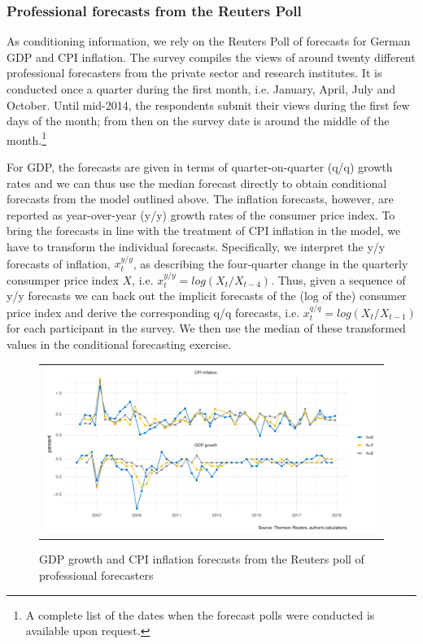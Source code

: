 \documentclass[notitlepage,a4paper,12pt]{article}
\begin{document}
\subsubsection{Professional forecasts from the Reuters Poll}

As conditioning information, we rely on the Reuters Poll of forecasts for German GDP and CPI inflation. The survey compiles the views of around twenty different professional forecasters from the private sector and research institutes. It is conducted once a quarter during the first month, i.e. January, April, July and October. Until mid-2014, the respondents submit their views during the first few days of the month; from then on the survey date is around the middle of the month.\footnote{A complete list of the dates when the forecast polls were conducted is available upon request.}  

For GDP, the forecasts are given in terms of quarter-on-quarter (q/q) growth rates and we can thus use the median forecast directly to obtain conditional forecasts from the model outlined above. The inflation forecasts, however, are reported as year-over-year (y/y) growth rates of the consumer price index. To bring the forecasts in line with the treatment of CPI inflation in the model, we have to transform the individual forecasts. Specifically, we interpret the y/y forecasts of inflation, $x_t^{y/y}$, as describing the four-quarter change in the quarterly consumper price index $X$, i.e. $ x_t^{y/y} = log(X_t/X_{t-4})$. Thus, given a sequence of y/y forecasts we can back out the implicit forecasts of the (log of the) consumer price index and derive the corresponding q/q forecasts, i.e. $ x_t^{q/q} = log(X_t/X_{t-1})$ for each participant in the survey. We then use the median of these transformed values in the conditional forecasting exercise.

\begin{figure}[htbp] \centering
    \caption{GDP growth and CPI inflation forecasts from the Reuters poll of professional forecasters \label{fig:reuterspoll}}
    \footnotesize
    \begin{tabular}{p{16cm}}
    \multicolumn{1}{c}{\includegraphics*[scale = 0.6]{../figures/fig_ReutersPoll.pdf}} \\
    \end{tabular}
    \newline
    \normalsize
\end{figure}
\end{document}
